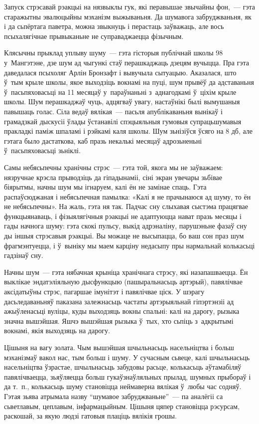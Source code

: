 Запуск стрэсавай рэакцыі на нязвыклы гук, які перавышае звычайны фон,~--- гэта старажытны эвалюцыйны мэханізм выжываньня. Да шумавога забруджваньня, як і да сьпёртага паветра, можна звыкнуць і перастаць заўважаць, але вось псыхалягічнае прывыканьне не суправаджаецца фізычным.

Клясычны прыклад уплыву шуму~--- гэта гісторыя публічнай школы 98 у~Мангэтэне, дзе шум ад чыгункі стаў перашкаджаць дзецям вучыцца. Пра гэта даведалася псыхоляг Арлін Бронзафт і вывучыла сытуацыю. Аказалася, што ў~тым крыле школы, якое выходзіць вокнамі на пуці, шум прывёў да адставаньня ў~пасьпяховасьці на 11 месяцаў у~параўнаньні з~аднагодкамі ў~ціхім крыле школы. Шум перашкаджаў чуць, адцягваў увагу, настаўнікі былі вымушаныя павышаць голас. Сіла ведаў вялікая~--- пасьля апублікаваньня вынікаў і грамадзкай дыскусіі ўлады ўстанавілі спэцыяльныя гумовыя супрацьшумавыя пракладкі паміж шпаламі і рэйкамі каля школы. Шум зьнізіўся ўсяго на 8 дб, але гэтага было дастаткова, каб празь некалькі месяцаў адрозьненьні ў~пасьпяховасьці зьніклі.

Самы небясьпечны хранічны стрэс~--- гэта той, якога мы не заўважаем: нязручнае крэсла прыводзіць да гіпадынаміі, сіні экран увечары зьбівае біярытмы, начны шум мы ігнаруем, калі ён не замінае спаць. Гэта распаўсюджаная і небясьпечная памылка: «Калі я не прачынаюся ад шуму, то ён не небясьпечны». На жаль, гэта ня так. Падчас сну слыхавая сыстэма працягвае функцыянаваць, і фізыялягічныя рэакцыі не адаптуюцца нават празь месяцы і гады начнога шуму: гэта скокі пульсу, выкід адрэналіну, парушэньне фазаў сну ды іншыя стрэсавыя рэакцыі. Вы можаце не высыпацца, бо ваш сон праз шум фрагмэнтуецца, і ў~выніку мы маем карціну недасыпу пры нармальнай колькасьці гадзінаў сну.

Начны шум~--- гэта нябачная крыніца хранічнага стрэсу, які назапашваецца. Ён выклікае эндатэліяльную дысфункцыю (пашыральнасьць артэрый), павялічвае аксідатыўны стрэс, пагаршае імунітэт і павялічвае ціск. У шэрагу дасьледаваньняў паказана залежнасьць частаты артэрыяльнай гіпэртэнзіі ад ажыўленасьці вуліцы, куды выходзяць вокны спальні: калі на дарогу, рызыка значна вышэйшая. Яшчэ вышэйшая рызыка ў~тых, хто сьпіць з~адкрытымі вокнамі, якія выходзяць на дарогу.

Цішыня на вагу золата. Чым вышэйшая шчыльнасьць насельніцтва і больш мэханізмаў вакол нас, тым больш і шуму. У сучасным сьвеце, калі шчыльнасьць насельніцтва ўзрастае, шчыльнасьць забудовы расьце, колькасьць аўтамабіляў павялічваецца, зьяўляецца больш гукаўзнаўляльных прылад, шумных прыбораў і да т.~п., колькасьць шуму становіцца неймаверна вялікая ў~любы час содняў. Гэтая зьява атрымала назву ``шумавое забруджваньне''~--- па аналёгіі са сьветлавым, цеплавым, інфармацыйным. Цішыня цяпер становіцца рэсурсам, раскошай, за якую людзі гатовыя плаціць вялікія грошы.


